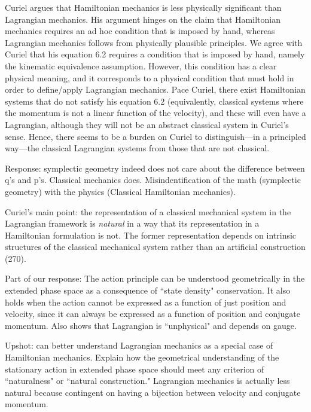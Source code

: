 \documentclass[letterpaper]{article}
\begin{document}
Curiel argues that Hamiltonian mechanics is less physically significant than Lagrangian mechanics. His argument hinges on the claim that Hamiltonian mechanics requires an ad hoc condition that is imposed by hand, whereas Lagrangian mechanics follows from physically plausible principles. We agree with Curiel that his equation 6.2 requires a condition that is imposed by hand, namely the kinematic equivalence assumption. However, this condition has a clear physical meaning, and it corresponds to a physical condition that must hold in order to define/apply Lagrangian mechanics. Pace Curiel, there exist Hamiltonian systems that do not satisfy his equation 6.2 (equivalently, classical systems where the momentum is not a linear function of the velocity), and these will even have a Lagrangian, although they will not be an abstract classical system in Curiel's sense. Hence, there seems to be a burden on Curiel to distinguish---in a principled way---the classical Lagrangian systems from those that are not classical.

Response: symplectic geometry indeed does not care about the difference between q's and p's. Classical mechanics does. Misindentification of the math (symplectic geometry) with the physics (Classical Hamiltonian mechanics).

Curiel's main point: the representation of a classical mechanical system in the Lagrangian framework is \textit{natural} in a way that its representation in a Hamiltonian formulation is not. The former representation depends on intrinsic structures of the classical mechanical system rather than an artificial construction (270).

Part of our response: The action principle can be understood geometrically in the extended phase space as a consequence of ``state density" conservation. It also holds when the action cannot be expressed as a function of just position and velocity, since it can always be expressed as a function of position and conjugate momentum. Also shows that Lagrangian is ``unphysical" and depends on gauge.


Upshot: can better understand Lagrangian mechanics as a special case of Hamiltonian mechanics. Explain how the geometrical understanding of the stationary action in extended phase space should meet any criterion of ``naturalness" or ``natural construction." Lagrangian mechanics is actually less natural because contingent on having a bijection between velocity and conjugate momentum.
\end{document}
